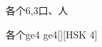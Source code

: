 \begin{entry}{各个}{6,3}{⼝、⼈}
  \begin{phonetics}{各个}{ge4 ge4}[][HSK 4]
  \end{phonetics}
\end{entry}
